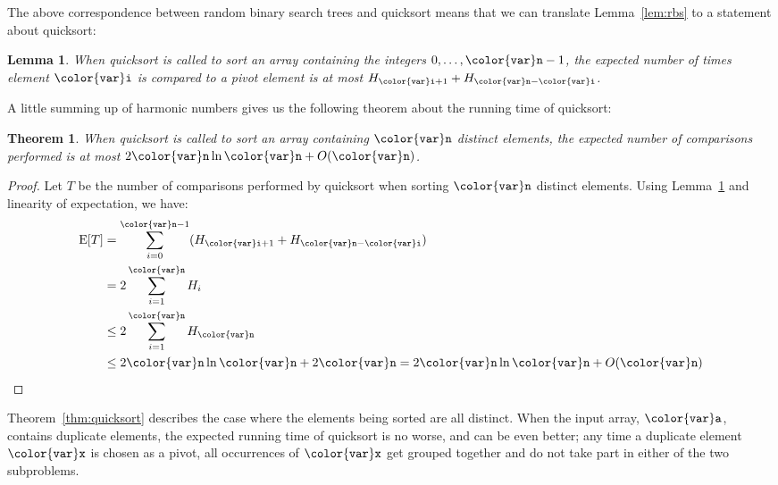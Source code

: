 \documentclass[10pt]{book}
\theoremstyle{plain}
\newtheorem{thm}{Theorem}[chapter]
\newcommand{\thmlabel}[1]{\label{thm:#1}}
\newcommand{\thmref}[1]{Theorem~\ref{thm:#1}}
\newtheorem{lem}{Lemma}[chapter]
\newcommand{\lemlabel}[1]{\label{lem:#1}}
\newcommand{\lemref}[1]{Lemma~\ref{lem:#1}}
\theoremstyle{definition}
\newcommand{\E}{\mathrm{E}}
\begin{document}
The above correspondence between random binary search trees and quicksort
means that we can translate \lemref{rbs} to a statement about quicksort:

\begin{lem}\lemlabel{quicksort}
  When quicksort is called to sort an array containing the integers
  $0,\ldots,\ensuremath{\mathtt{{\color{var}n}}}-1$, the expected number of times element \ensuremath{\mathtt{{\color{var}i}}} is compared
  to a pivot element is at most $H_{\ensuremath{\mathtt{{\color{var}i}}}+1} + H_{\ensuremath{\mathtt{{\color{var}n}}}-\ensuremath{\mathtt{{\color{var}i}}}}$.
\end{lem}

A little summing up of harmonic numbers gives us the following theorem
about the running time of quicksort:

\begin{thm}\thmlabel{quicksort-i}
  When quicksort is called to sort an array containing \ensuremath{\mathtt{{\color{var}n}}} distinct
  elements, the expected number of comparisons performed is at most
  $2\ensuremath{\mathtt{{\color{var}n}}}\ln \ensuremath{\mathtt{{\color{var}n}}} + O(\ensuremath{\mathtt{{\color{var}n}}})$.
\end{thm}

\begin{proof}
Let $T$ be the number of comparisons performed by quicksort when sorting
\ensuremath{\mathtt{{\color{var}n}}} distinct elements.  Using \lemref{quicksort} and linearity of
expectation, we have:
\begin{align*}
  \E[T] &= \sum_{i=0}^{\ensuremath{\mathtt{{\color{var}n}}}-1}(H_{\ensuremath{\mathtt{{\color{var}i}}}+1}+H_{\ensuremath{\mathtt{{\color{var}n}}}-\ensuremath{\mathtt{{\color{var}i}}}}) \\ 
        &= 2\sum_{i=1}^{\ensuremath{\mathtt{{\color{var}n}}}}H_i \\ 
        &\le 2\sum_{i=1}^{\ensuremath{\mathtt{{\color{var}n}}}}H_{\ensuremath{\mathtt{{\color{var}n}}}} \\ 
        &\le 2\ensuremath{\mathtt{{\color{var}n}}}\ln\ensuremath{\mathtt{{\color{var}n}}} + 2\ensuremath{\mathtt{{\color{var}n}}} = 2\ensuremath{\mathtt{{\color{var}n}}}\ln \ensuremath{\mathtt{{\color{var}n}}} + O(\ensuremath{\mathtt{{\color{var}n}}}) \qedhere
\end{align*}
\end{proof}

\thmref{quicksort} describes the case where the elements being sorted are
all distinct.  When the input array, \ensuremath{\mathtt{{\color{var}a}}}, contains duplicate elements,
the expected running time of quicksort is no worse, and can be even
better; any time a duplicate element \ensuremath{\mathtt{{\color{var}x}}} is chosen as a pivot, all
occurrences of \ensuremath{\mathtt{{\color{var}x}}} get grouped together and do not take part in either
of the two subproblems.
\end{document}
